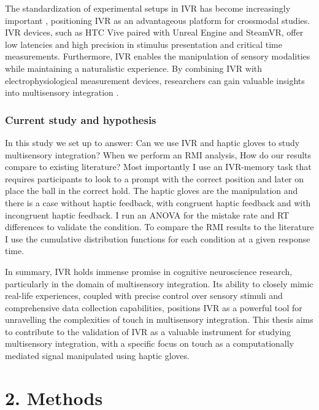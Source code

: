 \documentclass[12pt,oneside,openright]{report}
\begin{document}
The standardization of experimental setups in IVR has become increasingly important \parencite{Vasser2020GuidelinesFI,deGelder2018VirtualRA, Schne2023TheRO,vr_respont}, positioning IVR as an advantageous platform for crossmodal studies. IVR devices, such as HTC Vive paired with Unreal Engine and SteamVR, offer low latencies and high precision in stimulus presentation and critical time measurements. Furthermore, IVR enables the manipulation of sensory modalities while maintaining a naturalistic experience. By combining IVR with electrophysiological measurement devices, researchers can gain valuable insights into multisensory integration \parencite{Vasser2020GuidelinesFI}.

\subsubsection*{Current study and hypothesis}

In this study we set up to answer: Can we use IVR and haptic gloves to study multisensory integration? When we perform an RMI analysis, How do our results compare to existing literature? Most importantly I use an IVR-memory task that requires participants to look to a prompt with the correct position and later on place the ball in the correct hold. The haptic gloves are the manipulation and there is a case without haptic feedback, with congruent haptic feedback and with incongruent haptic feedback. I run an ANOVA for the mistake rate and RT differences to validate the condition.  To compare the RMI results to the literature I use the cumulative distribution functions for each condition at a given response time. 

In summary, IVR holds immense promise in cognitive neuroscience research, particularly in the domain of multisensory integration. Its ability to closely mimic real-life experiences, coupled with precise control over sensory stimuli and comprehensive data collection capabilities, positions IVR as a powerful tool for unravelling the complexities of touch in multisensory integration. This thesis aims to contribute to the validation of IVR as a valuable instrument for studying multisensory integration, with a specific focus on touch as a computationally mediated signal manipulated using haptic gloves.

\section*{2. Methods}
\end{document}
